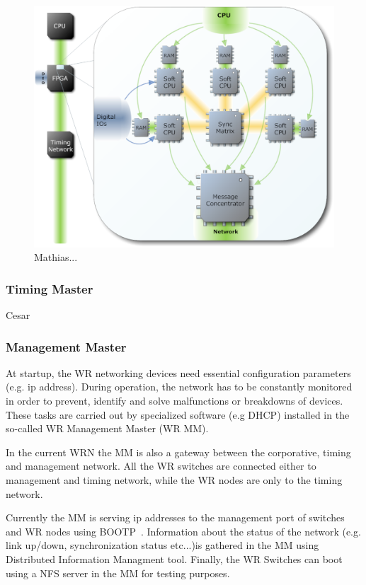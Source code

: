 \begin{figure}[htb]
   \centering
   \includegraphics*[scale=0.4]{fig/fatima7.eps}
   \caption{Mathias...}
   \label{fatima}
\end{figure}


\subsubsection{Timing Master}

Cesar

\subsubsection{Management Master}

At startup, the WR networking devices need essential configuration parameters (e.g. ip
address). During operation, the network has to be constantly monitored in
order to prevent, identify and solve malfunctions or breakdowns of devices. 
These tasks are carried out by specialized software (e.g DHCP) installed in the
so-called WR Management Master (WR MM). 

In the current WRN the MM is also a gateway between the corporative, timing and management 
network. All the WR switches are connected either to management and timing
network, while the WR nodes are only to the timing network. 

Currently the MM is serving ip addresses to the management port of switches and WR
nodes using BOOTP~\cite{bootp}. Information about the status of the network (e.g.
link up/down, synchronization status etc...)is gathered in the MM using Distributed Information Managment
tool. Finally, the WR Switches can boot using a NFS server in the MM for testing
purposes. 

